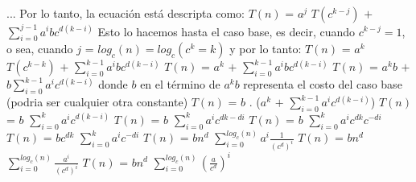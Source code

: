 \documentclass[10pt,a4paper]{article}
\begin{document}
\newline
\newline
\newline
...
\newline
\newline
\newline
Por lo tanto, la ecuación está descripta como:
\newline
\newline
$T(n)$ = $a^{j}$ $T(c^{k-j})$ $+$ $\displaystyle \sum_{i=0}^{j-1} a^{i}bc^{d(k-i)}$
\newline
\newline
Esto lo hacemos hasta el caso base, es decir, cuando $c^{k-j} = 1$, o sea, cuando $j$ = $log_{c}(n) = log_{c}(c^{k} = k) $ y por lo tanto:
\newline
\newline
$T(n)$ = $a^{k}$ $T(c^{k-k})$ $+$ $\displaystyle \sum_{i=0}^{k-1} a^{i}bc^{d(k-i)}$
\newline
\newline
\newline
$T(n)$ = $a^{k}$ $+$ $\displaystyle \sum_{i=0}^{k-1} a^{i}bc^{d(k-i)}$
\newline
\newline
\newline
$T(n)$ = $a^{k}b$ $+$ $b \displaystyle \sum_{i=0}^{k-1} a^{i}c^{d(k-i)}$ donde $b$ en el término de $a^{k}b$ representa el costo del caso base (podria ser cualquier otra constante)
\newline
\newline
$T(n)$ = $b$ . ($a^{k}$ $+$ $\displaystyle \sum_{i=0}^{k-1} a^{i}c^{d(k-i)}$)
\newline
\newline
\newline
$T(n)$ = $b$ $\displaystyle \sum_{i=0}^{k} a^{i}c^{d(k-i)}$
\newline
\newline
\newline
$T(n)$ = $b$ $\displaystyle \sum_{i=0}^{k} a^{i}c^{dk-di}$
\newline
\newline
\newline
$T(n)$ = $b$ $\displaystyle \sum_{i=0}^{k} a^{i}c^{dk}c^{-di}$
\newline
\newline
\newline
$T(n)$ = $bc^{dk}$ $\displaystyle \sum_{i=0}^{k} a^{i}c^{-di}$
\newline
\newline
\newline
$T(n)$ = $bn^{d}$ $\displaystyle \sum_{i=0}^{log_{c}(n)} a^{i} \displaystyle \frac{1}{(c^{d})^{i}}$
\newline
\newline
\newline
$T(n)$ = $bn^{d}$ $\displaystyle \sum_{i=0}^{log_{c}(n)}  \displaystyle \frac{a^{i}}{(c^{d})^{i}}$
\newline
\newline
\newline
$T(n)$ = $bn^{d}$ $\displaystyle \sum_{i=0}^{log_{c}(n)}  (\displaystyle \frac{a}{c^{d}})^{i}$
\newpage
\end{document}
